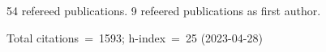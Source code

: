 54 refereed publications. 9 refeered publications as first author.

Total citations~=~1593; h-index~=~25 (2023-04-28)